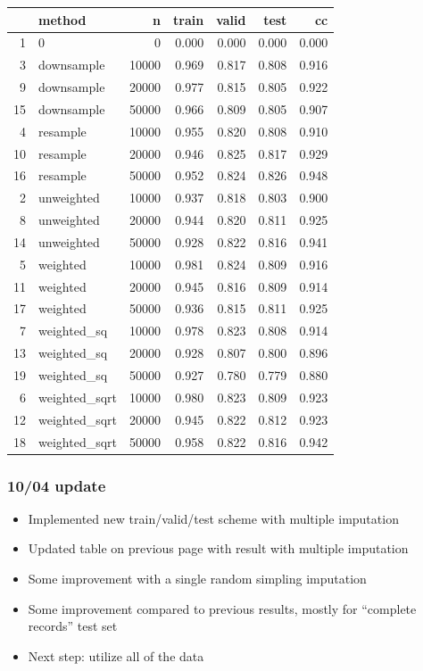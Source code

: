 \documentclass[12pt]{article}
\begin{document}
\begin{table}[ht]
\centering
\begin{tabular}{rlrrrrr}
  \hline
 & method & n & train & valid & test & cc \\ 
  \hline
1 & 0 &    0 & 0.000 & 0.000 & 0.000 & 0.000 \\ 
  3 & downsample & 10000 & 0.969 & 0.817 & 0.808 & 0.916 \\ 
  9 & downsample & 20000 & 0.977 & 0.815 & 0.805 & 0.922 \\ 
  15 & downsample & 50000 & 0.966 & 0.809 & 0.805 & 0.907 \\ 
  4 & resample & 10000 & 0.955 & 0.820 & 0.808 & 0.910 \\ 
  10 & resample & 20000 & 0.946 & 0.825 & 0.817 & 0.929 \\ 
  16 & resample & 50000 & 0.952 & 0.824 & 0.826 & 0.948 \\ 
  2 & unweighted & 10000 & 0.937 & 0.818 & 0.803 & 0.900 \\ 
  8 & unweighted & 20000 & 0.944 & 0.820 & 0.811 & 0.925 \\ 
  14 & unweighted & 50000 & 0.928 & 0.822 & 0.816 & 0.941 \\ 
  5 & weighted & 10000 & 0.981 & 0.824 & 0.809 & 0.916 \\ 
  11 & weighted & 20000 & 0.945 & 0.816 & 0.809 & 0.914 \\ 
  17 & weighted & 50000 & 0.936 & 0.815 & 0.811 & 0.925 \\ 
  7 & weighted\_sq & 10000 & 0.978 & 0.823 & 0.808 & 0.914 \\ 
  13 & weighted\_sq & 20000 & 0.928 & 0.807 & 0.800 & 0.896 \\ 
  19 & weighted\_sq & 50000 & 0.927 & 0.780 & 0.779 & 0.880 \\ 
  6 & weighted\_sqrt & 10000 & 0.980 & 0.823 & 0.809 & 0.923 \\ 
  12 & weighted\_sqrt & 20000 & 0.945 & 0.822 & 0.812 & 0.923 \\ 
  18 & weighted\_sqrt & 50000 & 0.958 & 0.822 & 0.816 & 0.942 \\ 
   \hline
\end{tabular}
\end{table}


\pagebreak
\subsubsection*{10/04 update}

\begin{itemize}
	\item Implemented new train/valid/test scheme with multiple imputation
	\item Updated table on previous page with result with multiple imputation
	\item Some improvement with a single random simpling imputation
	\item Some improvement compared to previous results, mostly for ``complete records'' test set
	\item Next step: utilize all of the data
\end{itemize}
\end{document}
